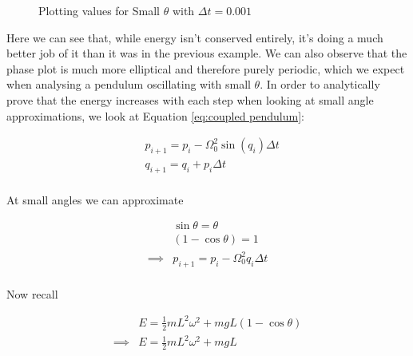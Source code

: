 \documentclass[12pt]{article}
\begin{document}
    \begin{figure}[H]
        \begin{center}
           \scalebox{.7}{}
           \caption{Plotting values for Small $\theta$ with $\Delta t = 0.001$}
           \label{fig:CP310b}
        \end{center}
    \end{figure}
    
    \noindent
    Here we can see that, while energy isn't conserved entirely, it's doing a much better 
    job of it than it was in the previous example. We can also observe that the phase plot is 
    much more elliptical and therefore purely periodic, which we expect when analysing a pendulum 
    oscillating with small $\theta$. In order to analytically prove that the energy increases 
    with each step when looking at small angle approximations, we look at Equation \ref{eq:coupled pendulum}:

    \begin{equation*}
        \begin{split}
            &p_{i+1} = p_i - \Omega_0^2 \sin(q_i) \Delta t \\
            &q_{i+1} = q_i + p_i \Delta t \\
        \end{split}
    \end{equation*}

    \begin{center}
        At small angles we can approximate
    \end{center}
    \begin{equation*}
        \begin{split}
            &\sin\theta = \theta \\
            &(1-\cos\theta) = 1 \\
            \implies &p_{i+1} = p_i - \Omega_0^2 q_i \Delta t \\
        \end{split}
    \end{equation*}

    \begin{center}
        Now recall
    \end{center}
    \begin{equation*}
        \begin{split}
            &E = \frac{1}{2}mL^2 \omega^2 + mgL(1-\cos\theta) \\
            \implies &E = \frac{1}{2}mL^2 \omega^2 + mgL
        \end{split}
    \end{equation*}
    
\end{document}

